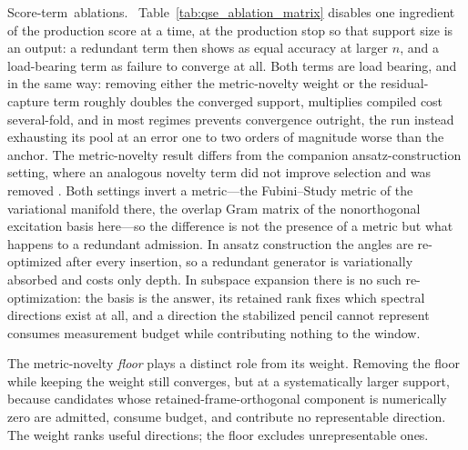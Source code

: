 \documentclass[
  reprint,
  amsmath,
  amssymb,
  aps,
  pra,
  nofootinbib,
  superscriptaddress,
  floatfix
]{revtex4-2}
\newcommand{\tentative}[1]{\textcolor{red!70!black}{#1}}
\newcommand{\structlabel}[1]{\noindent\mbox{\tentative{#1.}}~}
\begin{document}




\label{sec:ablations}
\structlabel{Score-term ablations}
Table~\ref{tab:qse_ablation_matrix} disables one ingredient of the production score at a time, at the production stop so that support size is an output: a redundant term then shows as equal accuracy at larger $n$, and a load-bearing term as failure to converge at all.  Both terms are load bearing, and in the same way: removing either the metric-novelty weight or the residual-capture term roughly doubles the converged support, multiplies compiled cost several-fold, and in most regimes prevents convergence outright, the run instead exhausting its pool at an error one to two orders of magnitude worse than the anchor.  The metric-novelty result differs from the companion ansatz-construction setting, where an analogous novelty term did not improve selection and was removed \cite{PaperI}.  Both settings invert a metric---the Fubini--Study metric of the variational manifold there, the overlap Gram matrix of the nonorthogonal excitation basis here---so the difference is not the presence of a metric but what happens to a redundant admission.  In ansatz construction the angles are re-optimized after every insertion, so a redundant generator is variationally absorbed and costs only depth.  In subspace expansion there is no such re-optimization: the basis is the answer, its retained rank fixes which spectral directions exist at all, and a direction the stabilized pencil cannot represent consumes measurement budget while contributing nothing to the window.

The metric-novelty \emph{floor} plays a distinct role from its weight.  Removing the floor while keeping the weight still converges, but at a systematically larger support, because candidates whose retained-frame-orthogonal component is numerically zero are admitted, consume budget, and contribute no representable direction.  The weight ranks useful directions; the floor excludes unrepresentable ones.


\end{document}
